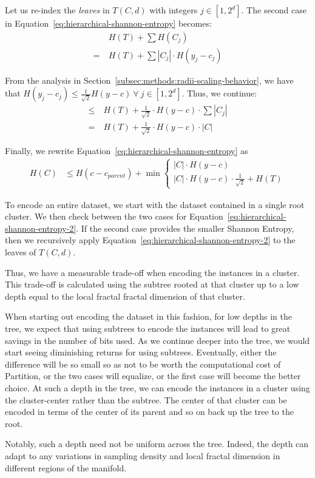Let us re-index the \textit{leaves} in $T(C, d)$ with integers $j \in [1, 2^d]$.
The second case in Equation~\ref{eq:hierarchical-shannon-entropy} becomes:
\begin{align*}
    & H(T) + \sum H(C_j) \\
    = \ & H(T) + \sum |C_j| \cdot H(y_j - c_j)
\end{align*}

From the analysis in Section~\ref{subsec:methods:radii-scaling-behavior}, we have that $H(y_j - c_j) \leq \frac{1}{\sqrt{2}} H(y - c) \ \forall \ j \in [1, 2^d]$.
Thus, we continue:
\begin{align*}
    \leq \ & H(T) + \frac{1}{\sqrt{2}} \cdot H(y - c) \cdot \sum |C_j| \\
    = \ & H(T) + \frac{1}{\sqrt{2}} \cdot H(y - c) \cdot |C|
\end{align*}

Finally, we rewrite Equation~\ref{eq:hierarchical-shannon-entropy} as
\begin{align}
    \label{eq:hierarchical-shannon-entropy-2}
    H(C) &\leq H(c - c_{parent}) + \min \begin{cases}
        |C| \cdot H(y - c) \\
        |C| \cdot H(y - c) \cdot \frac{1}{\sqrt{2}} + H(T)
    \end{cases}
\end{align}

To encode an entire dataset, we start with the dataset contained in a single root cluster.
We then check between the two cases for Equation~\ref{eq:hierarchical-shannon-entropy-2}.
If the second case provides the smaller Shannon Entropy, then we recursively apply Equation~\ref{eq:hierarchical-shannon-entropy-2} to the leaves of $T(C,d)$.

Thus, we have a measurable trade-off when encoding the instances in a cluster.
This trade-off is calculated using the subtree rooted at that cluster up to a low depth equal to the local fractal fractal dimension of that cluster.

When starting out encoding the dataset in this fashion, for low depths in the tree, we expect that using subtrees to encode the instances will lead to great savings in the number of bits used.
As we continue deeper into the tree, we would start seeing diminishing returns for using subtrees.
Eventually, either 
the difference will be so small so as not to be worth the computational cost of Partition, 
or the two cases will equalize, 
or the first case will become the better choice.
At such a depth in the tree, we can encode the instances in a cluster using the cluster-center rather than the subtree.
The center of that cluster can be encoded in terms of the center of its parent and so on back up the tree to the root.

Notably, such a depth need not be uniform across the tree.
Indeed, the depth can adapt to any variations in sampling density and local fractal dimension in different regions of the manifold.

